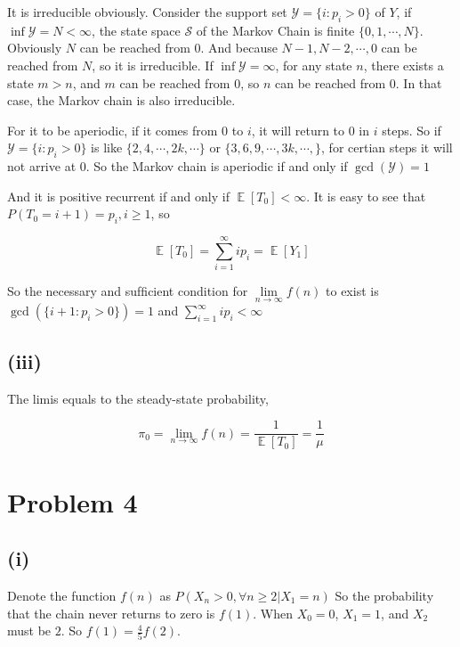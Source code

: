 \documentclass{article}
\DeclareMathOperator{\E}{\mathbb{E}}
\begin{document}
It is irreducible obviously. Consider the support set $\mathcal{Y}=\{i:p_i >0 \} $ of $Y$, if $\inf \mathcal{Y} = N < \infty$, the state space $\mathcal{S}$ of the Markov Chain is finite $\{0,1,\cdots,N\}$. Obviously $N$ can be reached from $0$.  And because $N-1,N-2,\cdots,0$ can be reached from $N$, so it is irreducible. If $\inf \mathcal{Y} =  \infty$, for any state $n$, there exists a state $m>n$, and  $m$ can be reached from $0$, so $n$ can be reached from $0$. In that case, the Markov chain is also irreducible.

For it to be aperiodic, if it comes from 0 to $i$, it will return to 0 in $i$ steps. So if $\mathcal{Y}=\{i:p_i >0 \} $ is like $\{2,4,\cdots,2k,\cdots\}$ or $\{3,6,9,\cdots,3k,\cdots,\}$, for certian steps it will not arrive at $0$. So the Markov chain is aperiodic if and only if $\operatorname{gcd}(\mathcal{Y} ) = 1$

And it is positive recurrent if and only if $\E[T_0] < \infty$. It is easy to see that $P(T_0 = i+1) = p_i, i\geqslant 1$, so 

\begin{equation}
    \E[T_0] = \sum_{i=1}^{\infty} ip_i = \E[Y_1] 
\end{equation}

So the necessary and sufﬁcient condition for $\lim\limits_{n\to\infty} f(n)$ to exist is $\operatorname{gcd}(\{i+1: p_i >0\}) = 1$ and $\sum_{i=1}^{\infty} ip_i  < \infty$

\subsection{(iii)}

The limis equals to the steady-state probability, 

\begin{equation}
    \pi_0 = \lim_{n\to\infty} f(n) = \frac{1}{\E[T_0]} = \frac{1}{\mu}
\end{equation}

\section{Problem 4}

\subsection{(i)}

Denote the function $f(n)$ as $P(X_n >0, \forall n\geqslant 2 | X_1 = n)$ So the probability that the chain never returns to zero is $f(1)$. When $X_0=0$, $X_1=1$, and  $X_2$ must be $2$. So $f(1) = \frac{4}{5}f(2)$.
\end{document}
